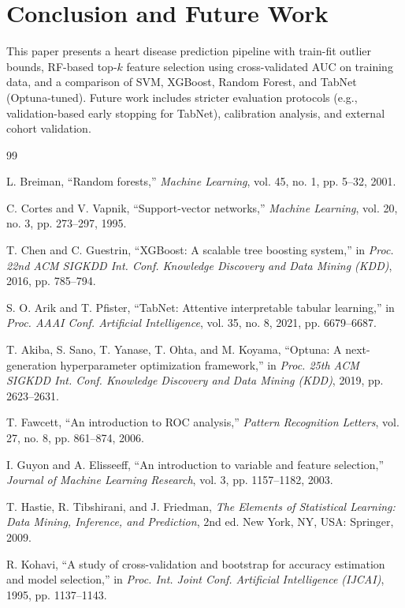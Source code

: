 \documentclass[10pt,conference]{IEEEtran}
\begin{document}
\section{Conclusion and Future Work}
This paper presents a heart disease prediction pipeline with train-fit outlier bounds, RF-based top-$k$ feature selection using cross-validated AUC on training data, and a comparison of SVM, XGBoost, Random Forest, and TabNet (Optuna-tuned). Future work includes stricter evaluation protocols (e.g., validation-based early stopping for TabNet), calibration analysis, and external cohort validation.



\begin{thebibliography}{99}

L. Breiman, ``Random forests,'' \emph{Machine Learning}, vol. 45, no. 1, pp. 5--32, 2001.

C. Cortes and V. Vapnik, ``Support-vector networks,'' \emph{Machine Learning}, vol. 20, no. 3, pp. 273--297, 1995.

T. Chen and C. Guestrin, ``XGBoost: A scalable tree boosting system,'' in
\emph{Proc. 22nd ACM SIGKDD Int. Conf. Knowledge Discovery and Data Mining (KDD)},
2016, pp. 785--794.

S. O. Arik and T. Pfister, ``TabNet: Attentive interpretable tabular learning,''
in \emph{Proc. AAAI Conf. Artificial Intelligence}, vol. 35, no. 8, 2021,
pp. 6679--6687.

T. Akiba, S. Sano, T. Yanase, T. Ohta, and M. Koyama,
``Optuna: A next-generation hyperparameter optimization framework,''
in \emph{Proc. 25th ACM SIGKDD Int. Conf. Knowledge Discovery and Data Mining (KDD)},
2019, pp. 2623--2631.

T. Fawcett, ``An introduction to ROC analysis,''
\emph{Pattern Recognition Letters}, vol. 27, no. 8, pp. 861--874, 2006.


I. Guyon and A. Elisseeff, ``An introduction to variable and feature selection,''
\emph{Journal of Machine Learning Research}, vol. 3, pp. 1157--1182, 2003.

T. Hastie, R. Tibshirani, and J. Friedman,
\emph{The Elements of Statistical Learning: Data Mining, Inference, and Prediction},
2nd ed. New York, NY, USA: Springer, 2009.

R. Kohavi, ``A study of cross-validation and bootstrap for accuracy estimation
and model selection,'' in \emph{Proc. Int. Joint Conf. Artificial Intelligence (IJCAI)},
1995, pp. 1137--1143.



\end{thebibliography}
\end{document}
